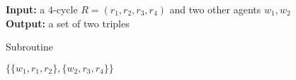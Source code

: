 \begin{algorithm}
\textbf{Input:} a $4$-cycle $R = ( r_1, r_2, r_3, r_4 )$ and two other agents $w_1, w_2$\\
\textbf{Output:} a set of two triples
\smallskip
\begin{algorithmic}
\caption{Subroutine~ \label{alg:3defr_wje_subroutine_oneC4TwoSingles}}
\State \Return $\{ \{ w_1, r_1, r_2  \}, \{ w_2, r_3, r_4 \} \}$
\end{algorithmic}
\end{algorithm}